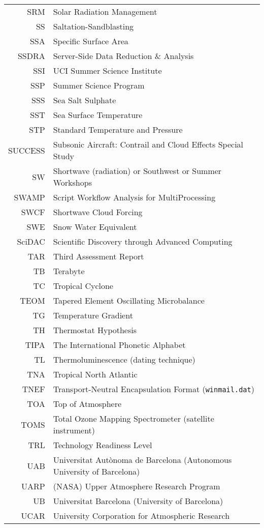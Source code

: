 \documentclass[12pt,twoside]{article}
\begin{document}
\begin{longtable}[>{\bfseries}l]{>{\ttfamily}r l}
SRM & Solar Radiation Management \\
SS & Saltation-Sandblasting \\
SSA & Specific Surface Area \\
SSDRA & Server-Side Data Reduction \& Analysis \\
SSI & UCI Summer Science Institute \\
SSP & Summer Science Program \\
SSS & Sea Salt Sulphate \\
SST & Sea Surface Temperature \\
STP & Standard Temperature and Pressure \\
SUCCESS & Subsonic Aircraft: Contrail and Cloud Effects Special Study \\
SW & Shortwave (radiation) or Southwest or Summer Workshops \\
SWAMP & Script Workflow Analysis for MultiProcessing \\
SWCF & Shortwave Cloud Forcing \\
SWE & Snow Water Equivalent \\
SciDAC & Scientific Discovery through Advanced Computing \\
TAR & Third Assessment Report \\
TB & Terabyte \\
TC & Tropical Cyclone \\
TEOM & Tapered Element Oscillating Microbalance \\
TG & Temperature Gradient \\
TH & Thermostat Hypothesis \\
TIPA & The International Phonetic Alphabet \\
TL & Thermoluminescence (dating technique) \\
TNA & Tropical North Atlantic \\
TNEF & Transport-Neutral Encapsulation Format (\texttt{winmail.dat}) \\
TOA & Top of Atmosphere \\
TOMS & Total Ozone Mapping Spectrometer (satellite instrument) \\
TRL & Technology Readiness Level \\
UAB & Universitat Aut\`{o}noma de Barcelona (Autonomous University of Barcelona) \\
UARP & (NASA) Upper Atmosphere Research Program \\
UB & Universitat Barcelona (University of Barcelona) \\
UCAR & University Corporation for Atmospheric Research \\

\end{longtable}
\end{document}
